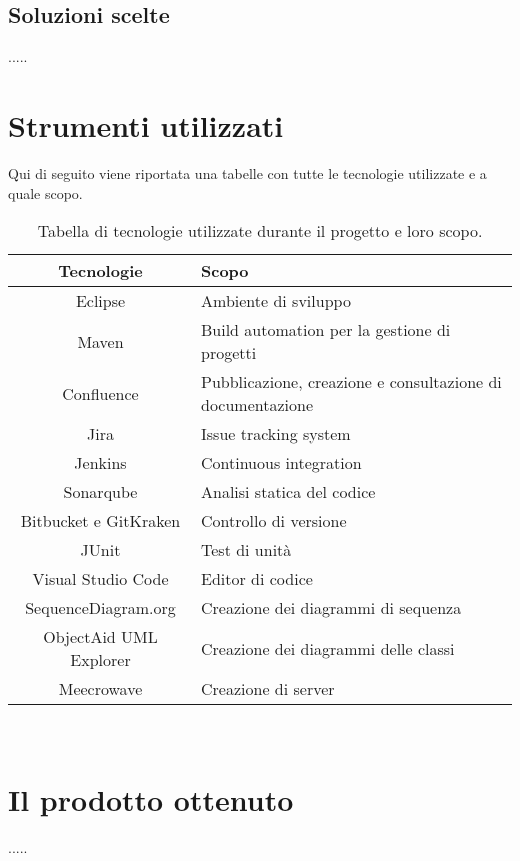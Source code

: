 \subsection{Soluzioni scelte}
.....


\section{Strumenti utilizzati}
Qui di seguito viene riportata una tabelle con tutte le tecnologie utilizzate e a quale scopo.

    \begin{table}[H]
        {\def\arraystretch{1.5}
        \begin{tabularx}{\textwidth}{c | X}
            \rowcolor{beautyblue}
            \textbf{Tecnologie} &
            \textbf{Scopo} \\ \hline
            Eclipse & Ambiente di sviluppo \\
            Maven & Build automation per la gestione di progetti \\
            Confluence & Pubblicazione, creazione e consultazione di documentazione \\
            Jira & Issue tracking system \\
            Jenkins & Continuous integration \\
            Sonarqube & Analisi statica del codice \\
            Bitbucket e GitKraken & Controllo di versione \\
            JUnit & Test di unità \\
            Visual Studio Code & Editor di codice \\
            SequenceDiagram.org & Creazione dei diagrammi di sequenza \\
            ObjectAid UML Explorer & Creazione dei diagrammi delle classi \\
            Meecrowave & Creazione di server \\
        \end{tabularx}} \\
    \caption{Tabella di tecnologie utilizzate durante il progetto e loro scopo.}
    \end{table}


\section{Il prodotto ottenuto}
.....

